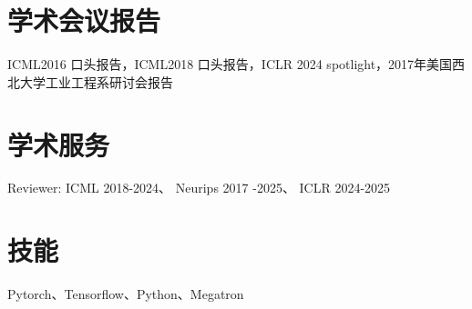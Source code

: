 \documentclass{resume}
\begin{document}
\section{学术会议报告}
ICML2016 口头报告，ICML2018 口头报告，ICLR 2024 spotlight，2017年美国西北大学工业工程系研讨会报告

\section{学术服务}

Reviewer: ICML 2018-2024、 Neurips 2017 -2025、 ICLR 2024-2025

\section{技能}
Pytorch、Tensorflow、Python、Megatron
\end{document}
